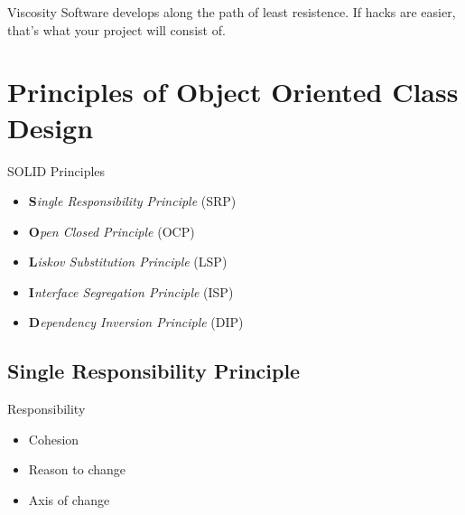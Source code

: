 \documentclass[xcolor=svgnames]{beamer}
\begin{document}

{%
%
\begin{frame}{Viscosity}
    Software develops along the path of least resistence.  If hacks are easier,
            that's what your project will consist of.
\end{frame}
}


\section[Class Design]{Principles of Object Oriented Class Design}


\begin{frame}{\secname}
    SOLID Principles
    \begin{itemize}
        \pause \item \textbf{S}\textit{ingle Responsibility Principle} (SRP)
        \pause \item \textbf{O}\textit{pen Closed Principle} (OCP)
        \pause \item \textbf{L}\textit{iskov Substitution Principle} (LSP)
        \pause \item \textbf{I}\textit{nterface Segregation Principle} (ISP)
        \pause \item \textbf{D}\textit{ependency Inversion Principle} (DIP)
    \end{itemize}
\end{frame}


\subsection{Single Responsibility Principle}


\begin{frame}{\subsecname}

    Responsibility
    \begin{itemize}
        \pause \item Cohesion
        \pause \item Reason to change
        \pause \item Axis of change
    \end{itemize}

\end{frame}
\end{document}
